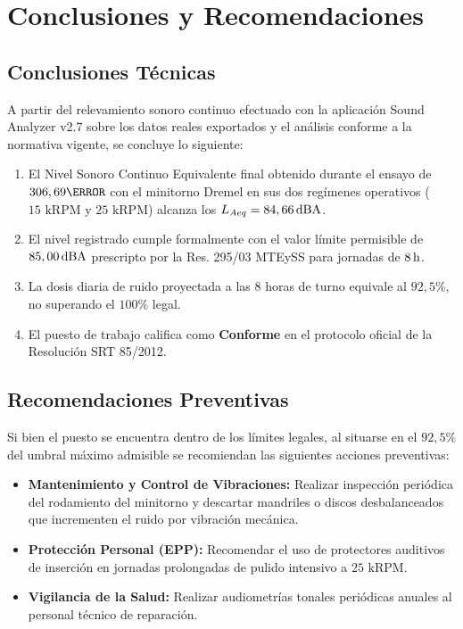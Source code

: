 \chapter{Conclusiones y Recomendaciones}
\label{sec:conclusiones}

\section{Conclusiones Técnicas}
A partir del relevamiento sonoro continuo efectuado con la aplicación Sound Analyzer v2.7 sobre los datos reales exportados
y el análisis conforme a la normativa vigente, se concluye lo siguiente:

\begin{enumerate}
  \item El Nivel Sonoro Continuo Equivalente final obtenido durante el ensayo de $306,69\s$ con el minitorno Dremel en
        sus dos regímenes operativos ($15\text{ kRPM}$ y $25\text{ kRPM}$) alcanza los $L_{Aeq} = 84,66\,\mathrm{dBA}$.
  \item El nivel registrado cumple formalmente con el valor límite permisible de $85,00\,\mathrm{dBA}$ prescripto por la Res. 295/03
        MTEySS para jornadas de $8\,\mathrm{h}$.
  \item La dosis diaria de ruido proyectada a las 8 horas de turno equivale al $92,5\%$, no superando el $100\%$ legal.
  \item El puesto de trabajo califica como \textbf{Conforme} en el protocolo oficial de la Resolución SRT 85/2012.
\end{enumerate}

\section{Recomendaciones Preventivas}
Si bien el puesto se encuentra dentro de los límites legales, al situarse en el $92,5\%$ del umbral máximo admisible se
recomiendan las siguientes acciones preventivas:

\begin{itemize}
  \item \textbf{Mantenimiento y Control de Vibraciones:} Realizar inspección periódica del rodamiento del minitorno y
        descartar mandriles o discos desbalanceados que incrementen el ruido por vibración mecánica.
  \item \textbf{Protección Personal (EPP):} Recomendar el uso de protectores auditivos de inserción en jornadas prolongadas
        de pulido intensivo a $25\text{ kRPM}$.
  \item \textbf{Vigilancia de la Salud:} Realizar audiometrías tonales periódicas anuales al personal técnico de reparación.
\end{itemize}
